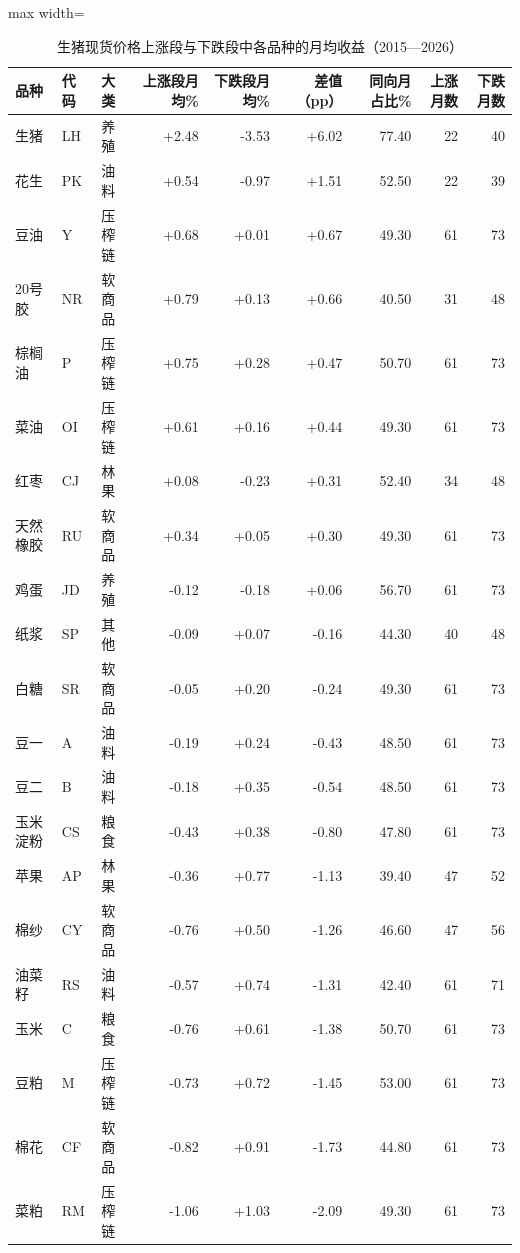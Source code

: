 \begin{table}[htbp]
\centering
\scriptsize
\caption{生猪现货价格上涨段与下跌段中各品种的月均收益（2015—2026）}
\label{tab:phase-long}
\begin{adjustbox}{max width=\textwidth}
\begin{tabular}{@{}lllrrrrrr@{}}
\toprule
品种 & 代码 & 大类 & 上涨段月均\% & 下跌段月均\% & 差值（pp） & 同向月占比\% & 上涨月数 & 下跌月数 \\
\midrule
生猪 & LH & 养殖 & +2.48 & -3.53 & +6.02 & 77.40 & 22 & 40 \\
花生 & PK & 油料 & +0.54 & -0.97 & +1.51 & 52.50 & 22 & 39 \\
豆油 & Y & 压榨链 & +0.68 & +0.01 & +0.67 & 49.30 & 61 & 73 \\
20号胶 & NR & 软商品 & +0.79 & +0.13 & +0.66 & 40.50 & 31 & 48 \\
棕榈油 & P & 压榨链 & +0.75 & +0.28 & +0.47 & 50.70 & 61 & 73 \\
菜油 & OI & 压榨链 & +0.61 & +0.16 & +0.44 & 49.30 & 61 & 73 \\
红枣 & CJ & 林果 & +0.08 & -0.23 & +0.31 & 52.40 & 34 & 48 \\
天然橡胶 & RU & 软商品 & +0.34 & +0.05 & +0.30 & 49.30 & 61 & 73 \\
鸡蛋 & JD & 养殖 & -0.12 & -0.18 & +0.06 & 56.70 & 61 & 73 \\
纸浆 & SP & 其他 & -0.09 & +0.07 & -0.16 & 44.30 & 40 & 48 \\
白糖 & SR & 软商品 & -0.05 & +0.20 & -0.24 & 49.30 & 61 & 73 \\
豆一 & A & 油料 & -0.19 & +0.24 & -0.43 & 48.50 & 61 & 73 \\
豆二 & B & 油料 & -0.18 & +0.35 & -0.54 & 48.50 & 61 & 73 \\
玉米淀粉 & CS & 粮食 & -0.43 & +0.38 & -0.80 & 47.80 & 61 & 73 \\
苹果 & AP & 林果 & -0.36 & +0.77 & -1.13 & 39.40 & 47 & 52 \\
棉纱 & CY & 软商品 & -0.76 & +0.50 & -1.26 & 46.60 & 47 & 56 \\
油菜籽 & RS & 油料 & -0.57 & +0.74 & -1.31 & 42.40 & 61 & 71 \\
玉米 & C & 粮食 & -0.76 & +0.61 & -1.38 & 50.70 & 61 & 73 \\
豆粕 & M & 压榨链 & -0.73 & +0.72 & -1.45 & 53.00 & 61 & 73 \\
棉花 & CF & 软商品 & -0.82 & +0.91 & -1.73 & 44.80 & 61 & 73 \\
菜粕 & RM & 压榨链 & -1.06 & +1.03 & -2.09 & 49.30 & 61 & 73 \\
\bottomrule
\end{tabular}
\end{adjustbox}
\end{table}
